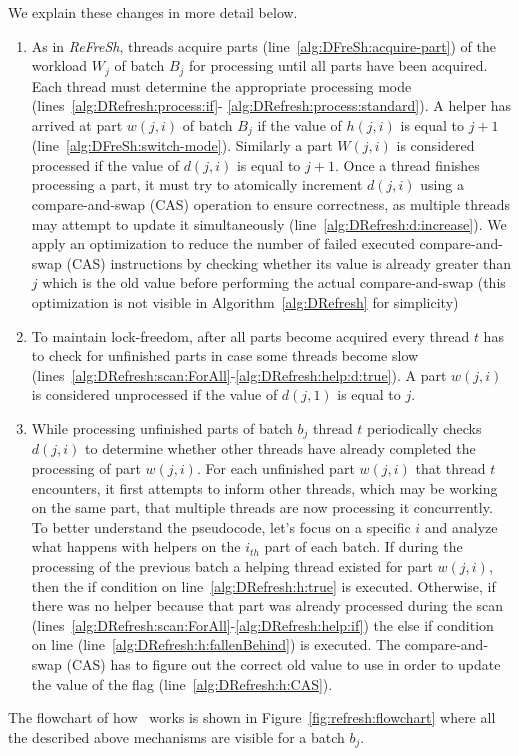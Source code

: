     We explain these changes in more detail below.

    \begin{enumerate}
        \item As in \textit{ReFreSh}, threads acquire parts (line~\ref{alg:DFreSh:acquire-part}) of the
        workload $W_j$ of batch $B_j$ for processing until all parts have been acquired. Each thread
        must determine the appropriate processing mode (lines~\ref{alg:DRefresh:process:if}-
        \ref{alg:DRefresh:process:standard}). A helper has arrived at part $w(j,i)$ of
        batch $B_j$ if the value of $h(j,i)$ is equal to $j + 1$ (line~\ref{alg:DFreSh:switch-mode}).
        Similarly a part $W(j,i)$ is considered processed if the value of $d(j,i)$ is equal to $j+1$.
        Once a thread finishes processing a part, it must try to atomically increment $d(j,i)$ using a
        compare-and-swap (CAS) operation to ensure correctness, as multiple threads may attempt
        to update it simultaneously (line~\ref{alg:DRefresh:d:increase}). 
        We apply an optimization to reduce the number of failed executed compare-and-swap (CAS)
        instructions by checking whether its value is already greater than $j$ which is the old value
        before performing the actual compare-and-swap
        (this optimization is not visible in Algorithm~\ref{alg:DRefresh} for simplicity)

    
        \item To maintain lock-freedom, after all parts become acquired every thread $t$ 
        has to check for unfinished parts in case some threads become slow
        (lines~\ref{alg:DRefresh:scan:ForAll}-\ref{alg:DRefresh:help:d:true}). A part 
        $w(j,i)$ is considered unprocessed if the value of $d(j,1)$ is equal to $j$.
          
        \item While processing unfinished parts of batch $b_j$ thread $t$ periodically checks $d(j,i)$  
        to determine whether other threads have already completed the processing of part $w(j,i)$.
        For each unfinished part $w(j,i)$ that thread $t$ encounters, it first attempts to inform other
        threads, which may be working on the same part, that multiple threads are now processing it
        concurrently. To better understand the pseudocode, let's focus on a specific $i$ and analyze
        what happens with helpers on the $i_{th}$ part of each batch. If during the processing of the
        previous batch a helping thread existed for part $w(j,i)$, then the if condition
        on line~\ref{alg:DRefresh:h:true} is executed. Otherwise, if there was no helper because that
        part was already processed during the scan (lines~\ref{alg:DRefresh:scan:ForAll}-\ref{alg:DRefresh:help:if})
        the else if condition on line (line~\ref{alg:DRefresh:h:fallenBehind}) is executed. 
        The compare-and-swap (CAS) has to figure out the correct old value to use in order to update
        the value of the flag (line~\ref{alg:DRefresh:h:CAS}).
    \end{enumerate}

The flowchart of how \Refresh\ works is shown in Figure~\ref{fig:refresh:flowchart} where 
all the described above mechanisms are visible for a batch $b_j$.